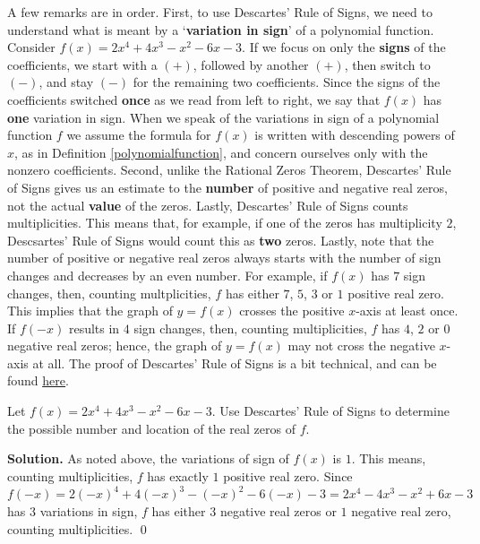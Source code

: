 \smallskip

A few remarks are in order. First, to use Descartes' Rule of Signs, we need to understand what is meant by a `\textbf{variation in sign}' of a polynomial function.  Consider $f(x) = 2x^4+4x^3-x^2-6x-3$.  If we focus on only the \textbf{signs} of the coefficients, we start with a $(+)$, followed by another $(+)$, then switch to $(-)$, and stay $(-)$ for the remaining two coefficients.  Since the signs of the coefficients switched \textbf{once} as we read from left to right, we say that $f(x)$ has \textbf{one} variation in sign.  When we speak of the variations in sign of a polynomial function $f$ we assume the formula for $f(x)$ is written with descending powers of $x$, as in Definition \ref{polynomialfunction}, and concern ourselves only with the nonzero coefficients.  Second, unlike the Rational Zeros Theorem, Descartes' Rule of Signs gives us an estimate to the \textbf{number} of positive and negative real zeros, not the actual \textbf{value} of the zeros. Lastly, Descartes' Rule of Signs counts multiplicities.  This means that, for example, if one of the zeros has multiplicity $2$, Descsartes' Rule of Signs would count this as \textbf{two} zeros.  Lastly, note that the number of positive or negative real zeros always starts with the number of sign changes and decreases by an even number.  For example, if $f(x)$ has $7$ sign changes, then, counting multplicities, $f$ has either $7$, $5$, $3$ or $1$ positive real zero.  This implies that the graph of $y=f(x)$ crosses the positive $x$-axis at least once.  If $f(-x)$ results in $4$ sign changes, then, counting multiplicities, $f$ has $4$, $2$ or $0$ negative real zeros;  hence, the graph of $y=f(x)$ may not cross the negative $x$-axis at all.  The proof of Descartes' Rule of Signs is a bit technical, and can be found \href{http://www.cut-the-knot.org/fta/ROS2.shtml}{\underline{here}}. 

\begin{ex}  Let $f(x) = 2x^4+4x^3-x^2-6x-3$.  Use Descartes' Rule of Signs to determine the possible number and location of the real zeros of $f$.

\smallskip

{\bf Solution.}  As noted above, the variations of sign of $f(x)$ is $1$. This means, counting multiplicities, $f$ has exactly $1$ positive real zero.  Since $f(-x)=2(-x)^4+4(-x)^3-(-x)^2-6(-x)-3=2x^4-4x^3-x^2+6x-3$ has $3$ variations in sign, $f$ has either $3$ negative real zeros or $1$ negative real zero, counting multiplicities. \qed

\label{DRSex}

\end{ex}

